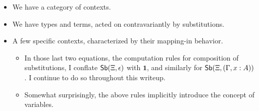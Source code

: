 \documentclass{article}
\begin{document}
\begin{itemize}
    \item We have a category of contexts.
    \item We have types and terms, acted on contravariantly by substitutions.
    \item A few specific contexts, characterized by their mapping-in behavior.
    \begin{itemize}
        \item In those last two equations, the computation rules for composition of substitutions,
        I conflate \(\mathsf{Sb}(\Xi,\epsilon)\) with \(\mathbf{1}\), and similarly for \(\mathsf{Sb}(\Xi,(\Gamma, x : A))\).
        I continue to do so throughout this writeup.
        \item Somewhat surprisingly, the above rules implicitly introduce the concept of variables.

\end{itemize}
\end{itemize}
\end{document}
